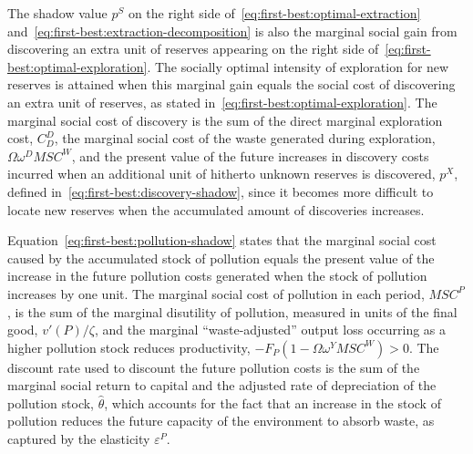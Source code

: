 The shadow value $p^S$ on the right side of~\eqref{eq:first-best:optimal-extraction} and~\eqref{eq:first-best:extraction-decomposition} is also the marginal social gain from discovering an extra unit of reserves appearing on the right side of~\eqref{eq:first-best:optimal-exploration}. The socially optimal intensity of exploration for new reserves is attained when this marginal gain equals the social cost of discovering an extra unit of reserves, as stated in~\eqref{eq:first-best:optimal-exploration}. The marginal social cost of discovery is the sum of the direct marginal exploration cost, $C_D^D$, the marginal social cost of the waste generated during exploration, $\Omega\omega^D MSC^W$, and the present value of the future increases in discovery costs incurred when an additional unit of hitherto unknown reserves is discovered, $p^X$, defined in~\eqref{eq:first-best:discovery-shadow}, since it becomes more difficult to locate new reserves when the accumulated amount of discoveries increases.

Equation~\eqref{eq:first-best:pollution-shadow} states that the marginal social cost caused by the accumulated stock of pollution equals the present value of the increase in the future pollution costs generated when the stock of pollution increases by one unit. The marginal social cost of pollution in each period, $MSC^P$, is the sum of the marginal disutility of pollution, measured in units of the final good, $v'(P)/\zeta$, and the marginal ``waste-adjusted'' output loss occurring as a higher pollution stock reduces productivity, $-F_P\left(1-\Omega\omega^Y MSC^W\right) > 0$. The discount rate used to discount the future pollution costs is the sum of the marginal social return to capital and the adjusted rate of depreciation of the pollution stock, $\widehat\theta$, which accounts for the fact that an increase in the stock of pollution reduces the future capacity of the environment to absorb waste, as captured by the elasticity $\varepsilon^P$.

